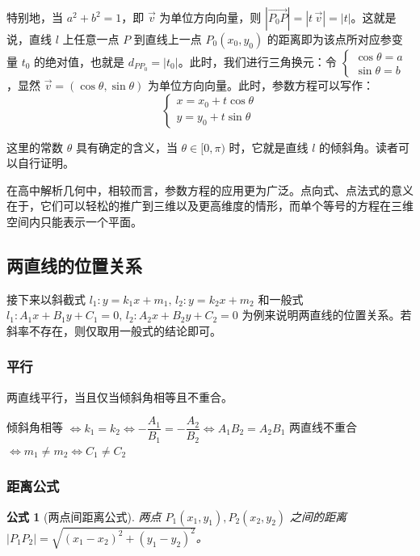 \documentclass[a4paper,openany]{ctexbook}
\newtheorem{formula}{公式}
\renewcommand{\vec}{\overrightarrow}
\begin{document}
特别地，当 \(a^2 + b^2 = 1\)，即 \(\vec{v}\) 为单位方向向量，则 \(|\vec{P_0P}|=|t\, \vec{v}|=|t|\)。这就是说，直线 \(l\) 上任意一点 \(P\) 到直线上一点 \(P_0(x_0,y_0)\) 的距离即为该点所对应参变量 \(t_0\) 的绝对值，也就是
\(d_{PP_0} =|t_0|\)。此时，我们进行三角换元：令 \(\begin{cases} \cos \theta = a \\ \sin \theta = b \end{cases} \)，显然 \(\vec{v} =(\cos \theta ,\sin \theta )\) 为单位方向向量。此时，参数方程可以写作：
\[\begin{cases}
        x=x_0 + t\cos \theta \\
        y=y_0 + t\sin \theta
    \end{cases}\]

这里的常数 \(\theta \) 具有确定的含义，当 \(\theta \in [0,\pi )\) 时，它就是直线 \(l\)  的倾斜角。读者可以自行证明。

在高中解析几何中，相较而言，参数方程的应用更为广泛。点向式、点法式的意义在于，它们可以轻松的推广到三维以及更高维度的情形，而单个等号的方程在三维空间内只能表示一个平面。

\subsection{两直线的位置关系}

接下来以斜截式 \(l_1:y = k_1x + m_1,\, l_2:y = k_2x + m_2\)  和一般式 \(l_1 :A_1x + B_1y + C_1 = 0,\, l_2:A_2x + B_2y + C_2 = 0\)  为例来说明两直线的位置关系。若斜率不存在，则仅取用一般式的结论即可。

\subsubsection{平行}

两直线平行，当且仅当倾斜角相等且不重合。

倾斜角相等 \(\Leftrightarrow k_1 = k_2 \Leftrightarrow - \dfrac{A_1}{B_1} =- \dfrac{A_2}{B_2} \Leftrightarrow A_1B_2 = A_2B_1\)
两直线不重合 \(\Leftrightarrow m_1 \neq m_2 \Leftrightarrow C_1 \neq C_2\)

\subsubsection{距离公式}

\begin{formula}[两点间距离公式]
    两点 \(P_1(x_1,y_1),P_2(x_2,y_2)\) 之间的距离 \(|P_1P_2|= \sqrt{(x_1 - x_2)^2 +(y_1 - y_2)^2}\)。
\end{formula}
\end{document}
